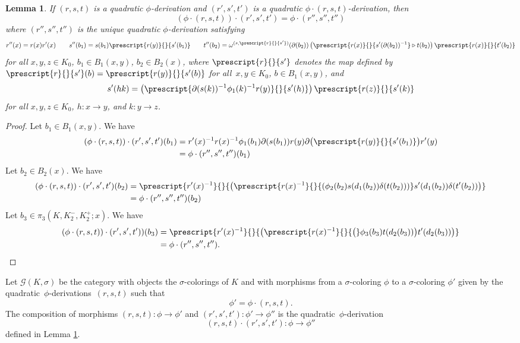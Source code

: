 \documentclass[a4paper, oneside]{amsart}
\numberwithin{equation}{subsection}
\theoremstyle{referencedlemma}
\theoremstyle{plain} %
\newtheorem{lem}[equation]{Lemma}
\theoremstyle{remark}
\begin{document}
\begin{lem}\label{Lemma composition}
If $(r,s,t)$ is a quadratic $\phi$-derivation and $(r',s',t')$ is a quadratic $\phi\cdot (r,s,t)$-derivation, then
$$
(\phi\cdot (r,s,t))\cdot (r',s',t') = \phi \cdot (r'', s'', t'')
$$
where $(r'', s'', t'')$ is the unique quadratic $\phi$-derivation satisfying
$$
r''(x) = r(x)r'(x)\quad \quad s''(b_1) = s(b_1)\prescript{r(y)}{}{s'(b_1)}\quad \quad t''(b_2) = \omega^{(s, \prescript{r}{}{s'})}(\partial (b_2)) \left(\prescript{r(x)}{}{s'(\partial (b_2))^{-1}}\triangleright t(b_2)\right)\prescript{r(x)}{}{t'(b_2)}
$$
for all $x,y,z \in K_0$, $b_1\in B_1(x,y)$, $b_2 \in B_2(x)$, where $\prescript{r}{}{s'}$ denotes the map defined by $\prescript{r}{}{s'}(b) = \prescript{r(y)}{}{s'(b)}$ for all~$x,y\in K_0$, $b\in B_1(x,y)$, and 
$$
s'(hk) =\left( \prescript{\partial (s(k))^{-1}\phi_1(k)^{-1}r(y)}{}{s'(h)}\right)\prescript{r(z)}{}{s'(k)}
$$
for all $x,y, z\in K_0$, $h\colon x\to y$, and $k\colon y\to z$. 
\end{lem}
\begin{proof}
Let $b_1\in B_1(x,y)$. We have
\begin{align*}
(\phi\cdot (r,s,t) )\cdot (r',s',t') (b_1) &= r'(x)^{-1}r(x)^{-1}\phi_1(b_1)\partial (s(b_1)) r(y)\partial \big(\prescript{r(y)}{}{s'(b_1)}\big)r'(y)\\
&= \phi\cdot (r'', s'', t'')(b_1)
\end{align*}
Let $b_2 \in B_2(x)$. We have
\begin{align*}
(\phi\cdot (r,s,t))\cdot (r',s',t') (b_2) &= \prescript{r'(x)^{-1}}{}{\left(\prescript{r(x)^{-1}}{}{\left(\phi_2(b_2)s(d_1 (b_2))\delta (t(b_2))\right)}s'(d_1 (b_2))\delta (t'(b_2))\right) }\\
&= \phi \cdot (r'', s'', t'')(b_2)
\end{align*}
Let $b_3 \in \pi_3(K, K_2^-, K_2^+; x)$. We have
\begin{align*}
(\phi\cdot (r,s,t))\cdot (r',s',t'))(b_3) &= \prescript{r'(x)^{-1}}{}{\left(\prescript{r(x)^{-1}}{}{\big (}\phi_3(b_3) t(d_2 (b_3))\big ) t'(d_2 (b_3))\right)}\\
&= \phi \cdot (r'', s'', t'').\qedhere
\end{align*}
\end{proof}

Let $\mathcal{G}(K,\sigma)$ be the category with objects the $\sigma$-colorings of $K$ and with morphisms from a $\sigma$-coloring $\phi$ to a $\sigma$-coloring $\phi'$ given by the quadratic~$\phi$-derivations~$(r,s,t)$ such that
$$
\phi' = \phi \cdot (r,s,t).
$$
The composition of morphisms $(r,s,t) \colon \phi \to \phi'$ and $(r',s',t')\colon \phi' \to \phi''$ is the quadratic~$\phi$-derivation
$$
(r, s, t)\cdot (r',s',t') \colon \phi \to \phi''
$$
defined in Lemma \ref{Lemma composition}.
\end{document}
